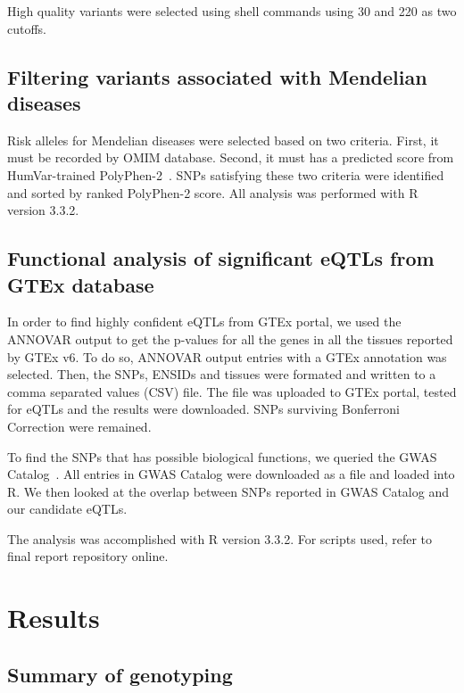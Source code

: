 \documentclass[a4paper, 12pt]{article}
\begin{document}
				High quality variants were selected using shell commands using 30 and 220 as two cutoffs.	
				
			\subsection*{Filtering variants associated with Mendelian diseases}
			
				Risk alleles for Mendelian diseases were selected based on two criteria. First, it must be recorded by OMIM database. Second, it must has a predicted score from HumVar-trained PolyPhen-2~\parencite{Adzhubei2010}. SNPs satisfying these two criteria were identified and sorted by ranked PolyPhen-2 score. All analysis was performed with R version 3.3.2.
				
			\subsection*{Functional analysis of significant eQTLs from GTEx database}
			
				In order to find highly confident eQTLs from GTEx portal, we used the ANNOVAR output to get the p-values for all the genes in all the tissues reported by GTEx v6. To do so, ANNOVAR output entries with a GTEx annotation was selected. Then, the SNPs, ENSIDs and tissues were formated and written to a comma separated values (CSV) file. The file was uploaded to GTEx portal, tested for eQTLs and the results were downloaded. SNPs surviving Bonferroni Correction were remained.
				
				To find the SNPs that has possible biological functions, we queried the GWAS Catalog~\parencite{MacArthur2017}. All entries in GWAS Catalog were downloaded as a file and loaded into R. We then looked at the overlap between SNPs reported in GWAS Catalog and our candidate eQTLs.
				
				The analysis was accomplished with R version 3.3.2. For scripts used, refer to final report repository online.
				
		\section*{Results}
		
			\subsection*{Summary of genotyping}
			
\end{document}
